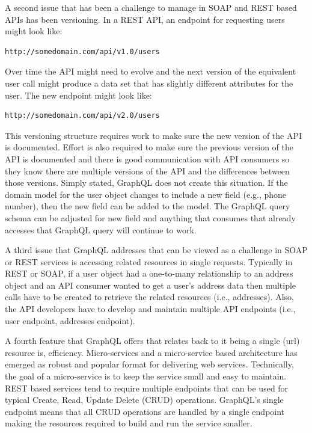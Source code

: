 A second issue that has been a challenge to manage in SOAP and REST based APIs
has been versioning.  In a REST API, an endpoint for requesting users might look
like:
\begin{verbatim}http://somedomain.com/api/v1.0/users \end{verbatim}
Over time the API might need to evolve and the next version of the equivalent
user call might produce a data set that has slightly different attributes for
the user. The new endpoint might look like:
\begin{verbatim}http://somedomain.com/api/v2.0/users \end{verbatim}
This versioning structure requires work to make sure the new version of the API
is documented.  Effort is also required to make sure the previous version of the
API is documented and there is good communication with API consumers so they
know there are multiple versions of the API and the differences between those
versions.  Simply stated, GraphQL does not create this situation.  If the domain
model for the user object changes to include a new field (e.g., phone number),
then the new field can be added to the model.  The GraphQL query schema can be
adjusted for new field and anything that consumes that already accesses that 
GraphQL query will continue to work.

A third issue that GraphQL addresses that can be viewed as a challenge in SOAP 
or REST services is accessing related resources in single requests\cite{FacebookGraphQL2018}.  
Typically in REST or SOAP, if a user object had a one-to-many relationship to 
an address object and an API consumer wanted to get a user's address data then 
multiple calls have to be created to retrieve the related resources 
(i.e., addresses).  Also, the API developers have to develop and maintain 
multiple API endpoints (i.e., user endpoint, addresses endpoint).

A fourth feature that GraphQL offers that relates back to it being a single 
(url) resource is, efficiency.  Micro-services and a micro-service based 
architecture has emerged as robust and popular format for delivering web 
services.  Technically, the goal of a micro-service is to keep the service small 
and easy to maintain. REST based services tend to require multiple endpoints 
that can be used for typical Create, Read, Update Delete (CRUD) operations.  
GraphQL's single endpoint means that all CRUD operations are handled by a single 
endpoint making the resources required to build and run the service smaller.

